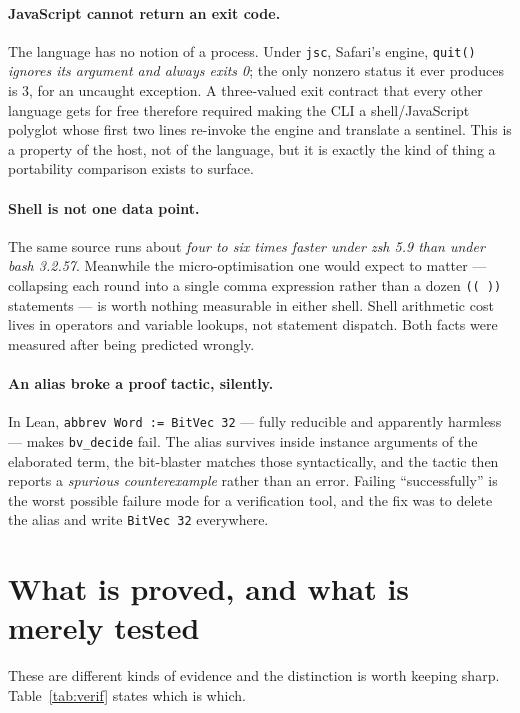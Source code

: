 \documentclass[11pt,a4paper]{article}
\newcommand{\code}[1]{\texttt{#1}}
\begin{document}
\paragraph{JavaScript cannot return an exit code.}
The language has no notion of a process. Under \code{jsc}, Safari's engine,
\code{quit()} \emph{ignores its argument and always exits 0}; the only nonzero
status it ever produces is 3, for an uncaught exception. A three-valued exit
contract that every other language gets for free therefore required making the
CLI a shell/JavaScript polyglot whose first two lines re-invoke the engine and
translate a sentinel. This is a property of the host, not of the language, but
it is exactly the kind of thing a portability comparison exists to surface.

\paragraph{Shell is not one data point.}
The same source runs about \emph{four to six times faster under zsh 5.9 than
under bash 3.2.57}. Meanwhile the micro-optimisation one would expect to
matter --- collapsing each round into a single comma expression rather than a
dozen \code{(( ))} statements --- is worth nothing measurable in either shell.
Shell arithmetic cost lives in operators and variable lookups, not statement
dispatch. Both facts were measured after being predicted wrongly.

\paragraph{An alias broke a proof tactic, silently.}
In Lean, \code{abbrev Word := BitVec 32} --- fully reducible and apparently
harmless --- makes \code{bv\_decide} fail. The alias survives inside instance
arguments of the elaborated term, the bit-blaster matches those syntactically,
and the tactic then reports a \emph{spurious counterexample} rather than an
error. Failing ``successfully'' is the worst possible failure mode for a
verification tool, and the fix was to delete the alias and write
\code{BitVec 32} everywhere.

\section{What is proved, and what is merely tested}
\label{sec:verification}

These are different kinds of evidence and the distinction is worth keeping
sharp. Table~\ref{tab:verif} states which is which.
\end{document}

